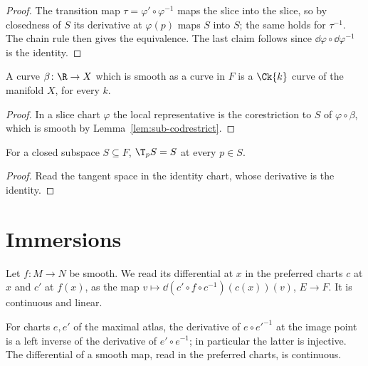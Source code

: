 \begin{proof}
  \leanok
  The transition map $\tau = \varphi' \circ \varphi^{-1}$ maps the slice into the slice, so by
  closedness of $S$ its derivative at $\varphi(p)$ maps $S$ into $S$; the same holds for
  $\tau^{-1}$. The chain rule then gives the equivalence. The last claim follows since
  $\dd\varphi \circ \dd\varphi^{-1}$ is the identity.
\end{proof}

\begin{proposition}[Curves]
  \label{prop:sub-curves}
  \leanok
  A curve $\beta \colon \R \to X$ which is smooth as a curve in $F$ is a $\Ck{k}$ curve of the
  manifold $X$, for every $k$.
\end{proposition}

\begin{proof}
  \leanok
  In a slice chart $\varphi$ the local representative is the corestriction to $S$ of
  $\varphi \circ \beta$, which is smooth by Lemma~\ref{lem:sub-codrestrict}.
\end{proof}

\begin{proposition}
  \label{prop:sub-tangent-subspace}
  \leanok
  For a closed subspace $S \subseteq F$, $\T_p S = S$ at every $p \in S$.
\end{proposition}

\begin{proof}
  \leanok
  Read the tangent space in the identity chart, whose derivative is the identity.
\end{proof}

\section{Immersions}

Let $f \colon M \to N$ be smooth. We read its differential at $x$ in the preferred charts
$c$ at $x$ and $c'$ at $f(x)$, as the map
$v \mapsto \dd(c' \circ f \circ c^{-1})(c(x))(v)$, $E \to F$. It is continuous and linear.

\begin{lemma}
  \label{lem:sub-transition-inverse}
  \leanok
  For charts $e, e'$ of the maximal atlas, the derivative of $e \circ e'^{-1}$ at the image
  point is a left inverse of the derivative of $e' \circ e^{-1}$; in particular the latter is
  injective. The differential of a smooth map, read in the preferred charts, is continuous.
\end{lemma}

